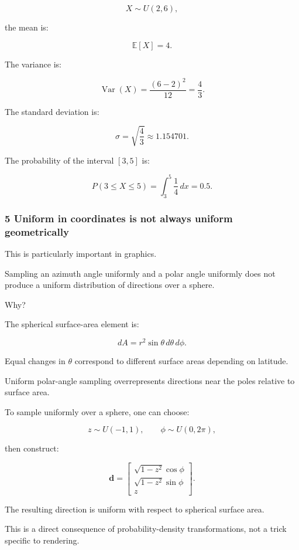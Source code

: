 \[
 X\sim U(2,6),
\]

the mean is:

\[
 \mathbb E[X]=4.
\]

The variance is:

\[
 \operatorname{Var}(X) = \frac{(6-2)^2}{12} = \boxed{\frac43}.
\]

The standard deviation is:

\[
 \sigma=\sqrt{\frac43}\approx1.154701.
\]

The probability of the interval \([3,5]\) is:

\[
 P(3\le X\le5) = \int_3^5\frac14\,dx =\boxed{0.5}.
\]

\subsubsection{5 Uniform in coordinates is not always uniform geometrically}\label{02-foundations-ii-ch023-uniform-in-coordinates-is-not-always-uniform-geometrically}

\hypertarget{02-foundations-ii-ch023-uniform-in-coordinates-is-not-always-uniform-geometrically}{}

This is particularly important in graphics.

Sampling an azimuth angle uniformly and a polar angle uniformly does not produce a uniform distribution of directions over a sphere.

Why?

The spherical surface-area element is:

\[
 dA=r^2\sin\theta\,d\theta\,d\phi.
\]

Equal changes in \(\theta\) correspond to different surface areas depending on latitude.

Uniform polar-angle sampling overrepresents directions near the poles relative to surface area.

To sample uniformly over a sphere, one can choose:

\[
 z\sim U(-1,1), \qquad \phi\sim U(0,2\pi),
\]

then construct:

\[
 \mathbf d= \begin{bmatrix} \sqrt{1-z^2}\cos\phi\\ \sqrt{1-z^2}\sin\phi\\ z \end{bmatrix}.
\]

The resulting direction is uniform with respect to spherical surface area.

This is a direct consequence of probability-density transformations, not a trick specific to rendering.

